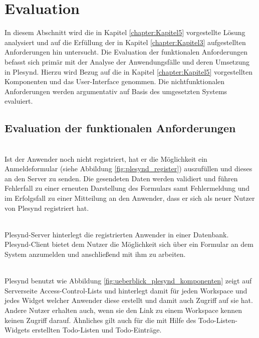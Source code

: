 \section{Evaluation}\label{section:evaluation}
In diesem Abschnitt wird die in Kapitel \ref{chapter:Kapitel5} vorgestellte Lösung analysiert und auf die Erfüllung der in Kapitel \ref{chapter:Kapitel3} aufgestellten Anforderungen hin untersucht. Die Evaluation der funktionalen Anforderungen befasst sich primär mit der Analyse der Anwendungsfälle und deren Umsetzung in Plesynd. Hierzu wird Bezug auf die in Kapitel \ref{chapter:Kapitel5} vorgestellten Komponenten und das User-Interface genommen. Die nichtfunktionalen Anforderungen werden argumentativ auf Basis des umgesetzten Systems evaluiert.

\subsection{Evaluation der funktionalen Anforderungen}\label{section:funktionale_anforderungen_evaluation}
\textbullet{}  \emph{\requirementRegistrieren}\\
Ist der Anwender noch nicht registriert, hat er die Möglichkeit ein Anmeldeformular (siehe Abbildung \ref{fig:plesynd_register}) auszufüllen und dieses an den Server zu senden. Die gesendeten Daten werden validiert und führen Fehlerfall zu einer erneuten Darstellung des Formulars samt Fehlermeldung und im Erfolgsfall zu einer Mitteilung an den Anwender, dass er sich als neuer Nutzer von Plesynd registriert hat.

\textbullet{}  \emph{\requirementLogin}\\
Plesynd-Server hinterlegt die registrierten Anwender in einer Datenbank. Plesynd-Client bietet dem Nutzer die Möglichkeit sich über ein Formular an dem System anzumelden und anschließend mit ihm zu arbeiten.

\textbullet{}  \emph{\requirementZugriffAufEigeneWidgets}\\
Plesynd benutzt wie Abbildung \ref{fig:ueberblick_plesynd_komponenten} zeigt auf Serverseite Access-Control-Lists und hinterlegt damit für jeden Workspace und jedes Widget welcher Anwender diese erstellt und damit auch Zugriff auf sie hat. Andere Nutzer erhalten auch, wenn sie den Link zu einem Workspace kennen keinen Zugriff darauf. Ähnliches gilt auch für die mit Hilfe des Todo-Listen-Widgets erstellten Todo-Listen und Todo-Einträge.

